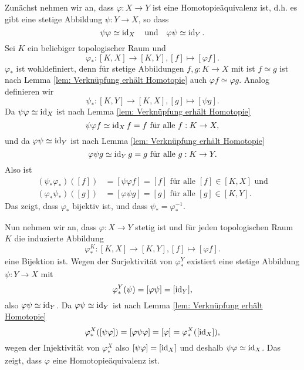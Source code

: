 \documentclass[a4paper,10pt]{article}
\begin{document}
Zunächst nehmen wir an, dass $\varphi : X \to Y$ ist eine Homotopieäquivalenz ist, d.h. es gibt eine stetige Abbildung $\psi : Y \to X$, so dass
\[
 \psi \varphi \simeq \operatorname{id}_X \quad \text{und} \quad \varphi \psi \simeq \operatorname{id}_Y.
\]
Sei $K$ ein beliebiger topologischer Raum und
\[
 \varphi_* : [K,X] \to [K,Y], [f] \mapsto [\varphi f].
\]
$\varphi_*$ ist wohldefiniert, denn für stetige Abbildungen $f,g : K \to X$ mit ist $f \simeq g$ ist nach Lemma \ref{lem: Verknüpfung erhält Homotopie} auch $\varphi f \simeq \varphi g$. Analog definieren wir
\[
 \psi_* : [K,Y] \to [K,X], [g] \mapsto [\psi g].
\]
Da $\psi \varphi \simeq \operatorname{id}_X$ ist nach Lemma \ref{lem: Verknüpfung erhält Homotopie}
\[
 \psi \varphi f \simeq \operatorname{id}_X f = f \text{ für alle } f : K \to X,
\]
und da $\varphi \psi \simeq \operatorname{id}_Y$ ist nach Lemma \ref{lem: Verknüpfung erhält Homotopie}
\[
 \varphi \psi g \simeq \operatorname{id}_Y g = g \text{ für alle } g : K \to Y.
\]
Also ist
\begin{align*}
 (\psi_* \varphi_*)([f]) &= [\psi \varphi f] = [f] \text{ für alle } [f] \in [K,X] \text{ und}\\
 (\varphi_* \psi_*)([g]) &= [\varphi \psi g] = [g] \text{ für alle } [g] \in [K,Y].
\end{align*}
Das zeigt, dass $\varphi_*$ bijektiv ist, und dass $\psi_* = \varphi_*^{-1}$.

Nun nehmen wir an, dass $\varphi : X \to Y$ stetig ist und für jeden topologischen Raum $K$ die induzierte Abbildung
\[
 \varphi^K_* : [K,X] \to [K,Y], [f] \mapsto [\varphi f].
\]
eine Bijektion ist. Wegen der Surjektivität von $\varphi_*^Y$ existiert eine stetige Abbildung $\psi : Y \to X$ mit
\[
 \varphi_*^Y(\psi) = [\varphi \psi] = [\operatorname{id}_Y],
\]
also $\varphi \psi \simeq \operatorname{id}_Y$. Da $\varphi \psi \simeq \operatorname{id}_Y$ ist nach Lemma \ref{lem: Verknüpfung erhält Homotopie}
\[
 \varphi_*^X([\psi \varphi]) = [\varphi \psi \varphi] = [\varphi] = \varphi_*^X([\operatorname{id}_X]),
\]
wegen der Injektivität von $\varphi_*^X$ also $[\psi \varphi] = [\operatorname{id}_X]$ und deshalb $\psi \varphi \simeq \operatorname{id}_X$. Das zeigt, dass $\varphi$ eine Homotopieäquivalenz ist.
\end{document}
